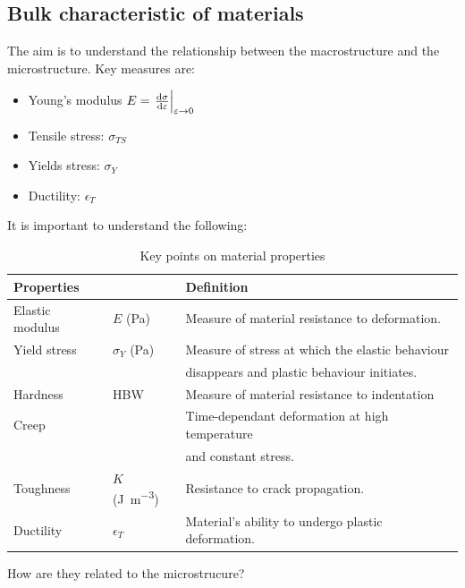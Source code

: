 \documentclass[class=report, crop=false, 12pt,a4paper]{standalone}
\begin{document}
\subsection{Bulk characteristic of materials}
The aim is to understand the relationship between the macrostructure and the microstructure. Key measures are:
\begin{itemize}
	\item Young's modulus $E = \left. \frac{\dif \sigma}{\dif \varepsilon} \right|_{\varepsilon \rightarrow 0}$
	\item Tensile stress: $\sigma_{TS}$
	\item Yields stress: $\sigma_{Y}$
	\item Ductility: $\epsilon_{T}$
\end{itemize}
It is important to understand the following:
\begin{table}
	\centering
	\begin{tabular}{@{}lll@{}}
		\toprule
		\textbf{Properties} & &\textbf{Definition}\\
		\midrule
		Elastic modulus & $E$ (\si{\pascal}) & Measure of material resistance to deformation.\\
		Yield stress & $\sigma_Y$ (\si{\pascal}) & Measure of stress at which the elastic behaviour\\
		& & disappears and plastic behaviour initiates.\\
		Hardness & HBW & Measure of material resistance to indentation\\
		Creep & & Time-dependant deformation at high temperature\\
		& & and constant stress.\\
		Toughness & $K$ (\si{\joule\per\meter\cubed}) & Resistance to crack propagation.\\
		Ductility & $\epsilon_T$ & Material's ability to undergo plastic deformation.\\
		\bottomrule
	\end{tabular}
	\caption{Key points on material properties}
\end{table}
How are they related to the microstrucure? 
\end{document}
